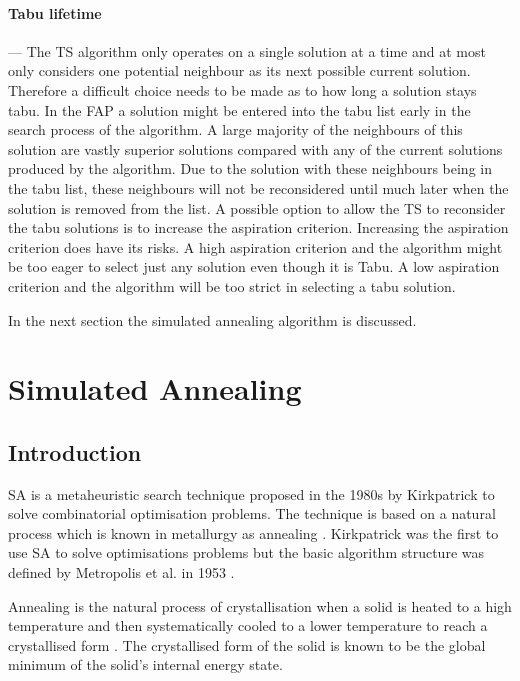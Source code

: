 \paragraph{Tabu lifetime}
--- The \gls{TS} algorithm only operates on a single solution at a time and at most only considers one potential neighbour as its next possible current solution. Therefore a difficult choice needs to be made as to how long a solution stays tabu. In the \gls{FAP} a solution might be entered into the tabu list early in the search process of the algorithm. A large majority of the neighbours of this solution are vastly superior solutions compared with any of the current solutions produced by the algorithm. Due to the solution with these neighbours being in the tabu list, these neighbours will not be reconsidered until much later when the solution is removed from the list. A possible option to allow the \gls{TS} to reconsider the tabu solutions is to increase the aspiration criterion. Increasing the aspiration criterion does have its risks. A high aspiration criterion and the algorithm might be too eager to select just any solution even though it is Tabu. A low aspiration criterion and the algorithm will be too strict in selecting a tabu solution.

In the next section the simulated annealing algorithm is discussed.
\section{Simulated Annealing}
\label{sec:simulatedannealing}

\subsection{Introduction}
\label{sec:SAIntroduction}
\gls{SA} is a metaheuristic search technique proposed in the 1980s by Kirkpatrick to solve combinatorial optimisation problems. The technique is based on a natural process which is known in metallurgy as annealing \cite{CurveFittingSA,SASingleMultiObj,TempCyclingSA,ChaosSA}. Kirkpatrick was the first to use \gls{SA} to solve optimisations problems but the basic algorithm structure was defined by Metropolis et al. in 1953 \cite{CurveFittingSA,VeryFastSAImageEnchancement}.

Annealing is the natural process of crystallisation when a solid is heated to a high temperature and then systematically cooled to a lower temperature to reach a crystallised form \cite{CurveFittingSA,NewSAs,MobileRobotSA,ConstantTempSA}. The crystallised form of the solid is known to be the global minimum of the solid's internal energy state. 

